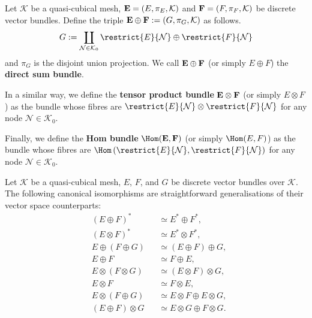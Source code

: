 \begin{definition}
  Let $\mathcal{K}$ be a quasi-cubical mesh,
  ${\bf E} = (E, \pi_E, \mathcal{K})$ and ${\bf F} = (F, \pi_F, \mathcal{K})$
  be discrete vector bundles.
  Define the triple ${\bf E} \oplus {\bf F}:= (G, \pi_G, \mathcal{K})$
  as follows.
  \begin{equation}
    G :=
    \coprod_{\mathcal{N} \in \mathcal{K}_0}
      \restrict{E}{\mathcal{N}} \oplus \restrict{F}{\mathcal{N}}
  \end{equation}
  and $\pi_G$ is the disjoint union projection.
  We call ${\bf E} \oplus {\bf F}$ (or simply $E \oplus F$) the
  \textbf{direct sum bundle}.

  In a similar way, we define the \textbf{tensor product bundle}
  ${\bf E} \otimes {\bf F}$ (or simply $E \otimes F$)
  as the bundle whose fibres are
  $\restrict{E}{\mathcal{N}} \otimes \restrict{F}{\mathcal{N}}$
  for any node $\mathcal{N} \in \mathcal{K}_0$.

  Finally, we define the \textbf{Hom bundle}
  $\Hom({\bf E}, {\bf F})$ (or simply $\Hom(E, F)$)
  as the bundle whose fibres are
  $\Hom\left(\restrict{E}{\mathcal{N}}, \restrict{F}{\mathcal{N}}\right)$
  for any node $\mathcal{N} \in \mathcal{K}_0$.
\end{definition}
\begin{proposition}
  Let $\mathcal{K}$ be a quasi-cubical mesh, $E$, $F$, and $G$
  be discrete vector bundles over $\mathcal{K}$.
  The following canonical isomorphisms are straightforward generalisations of
  their vector space counterparts:
  \begin{subequations}
    \begin{alignat}{2}
      & (E \oplus F)^*          && \simeq E^* \oplus F^*, \\
      & (E \otimes F)^*         && \simeq E^* \otimes F^*, \\
      & E \oplus (F \oplus G)   && \simeq (E \oplus F) \oplus G, \\
      & E \oplus F              && \simeq F \oplus E, \\
      & E \otimes (F \otimes G) && \simeq (E \otimes F) \otimes G, \\
      & E \otimes F             && \simeq F \otimes E, \\
      & E \otimes (F \oplus G)  && \simeq E \otimes F \oplus E \otimes G, \\
      & (E \oplus F) \otimes G  && \simeq E \otimes G \oplus F \otimes G.
    \end{alignat}
  \end{subequations}
\end{proposition}
